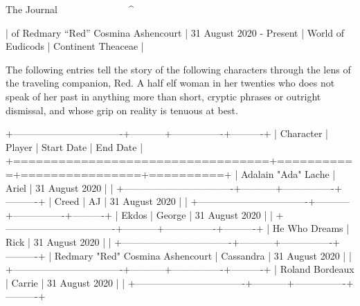 The Journal
^^^^^^^^^^^^^^^^^^^^^^^^^^^^^^^^^^^^^^^^^^^^^^^^^^^^^^^^^^^^^^^^^^^^^^^^^^^^

| of Redmary “Red” Cosmina Ashencourt
| 31 August 2020 - Present
| World of Eudicods
| Continent Theaceae
|

The following entries tell the story of the following characters through the lens of the traveling companion, Red.  A half elf woman in her twenties who does not speak of her past in anything more than short, cryptic phrases or outright dismissal, and whose grip on reality is tenuous at best.

+----------------------------------+-----------+----------------+----------+
| Character                        | Player    | Start Date     | End Date |
+==================================+===========+================+==========+
| Adalain "Ada" Lache              | Ariel     | 31 August 2020 |          |
+----------------------------------+-----------+----------------+----------+
| Creed                            | AJ        | 31 August 2020 |          |
+----------------------------------+-----------+----------------+----------+
| Ekdos                            | George    | 31 August 2020 |          |
+----------------------------------+-----------+----------------+----------+
| He Who Dreams                    | Rick      | 31 August 2020 |          |
+----------------------------------+-----------+----------------+----------+
| Redmary "Red" Cosmina Ashencourt | Cassandra | 31 August 2020 |          |
+----------------------------------+-----------+----------------+----------+
| Roland Bordeaux                  | Carrie    | 31 August 2020 |          |
+----------------------------------+-----------+----------------+----------+
